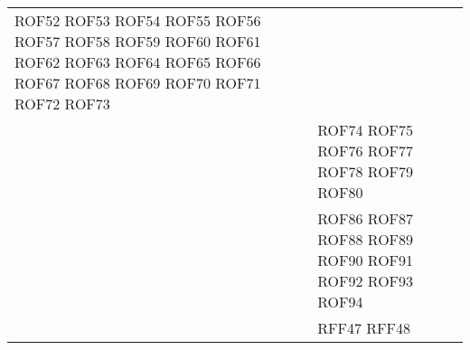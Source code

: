 \documentclass[../DefinizioneDiProdotto_v3.0.0.tex]{subfiles}
\begin{document}
\begin{longtable}{p{8.5cm}!{\VRule[1pt]}p{2.5cm}}
	ROF52 \newline
	ROF53 \newline
	ROF54 \newline
	ROF55 \newline
	ROF56 \newline
	ROF57 \newline
	ROF58 \newline
	ROF59 \newline
	ROF60 \newline
	ROF61 \newline
	ROF62 \newline
	ROF63 \newline
	ROF64 \newline
	ROF65 \newline
	ROF66 \newline
	ROF67 \newline
	ROF68 \newline
	ROF69 \newline
	ROF70 \newline
	ROF71 \newline
	ROF72 \newline
	ROF73 \\
	                   & ROF74 \newline
	ROF75 \newline
	ROF76 \newline
	ROF77 \newline
	ROF78 \newline
	ROF79 \newline
	ROF80 \newline
	 \\
	                                                                       & ROF86 \newline
	ROF87 \newline
	ROF88 \newline
	ROF89 \newline
	ROF90 \newline
	ROF91 \newline
	ROF92 \newline
	ROF93 \newline
	ROF94
	 \\
	                                                                        & RFF47 \newline
	RFF48 \newline

\end{longtable}
\end{document}
